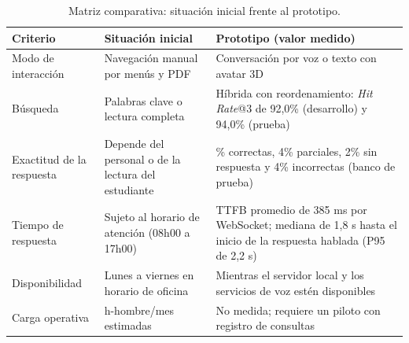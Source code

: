 \begin{table}[H]
  \caption{Matriz comparativa: situación inicial frente al prototipo.}
  \label{tab:matriz_comparativa}
  \centering
  \small
  \renewcommand{\arraystretch}{1.2}
  \begin{tabular}{|>{\raggedright\arraybackslash}p{3.0cm}|>{\raggedright\arraybackslash}p{4.4cm}|>{\raggedright\arraybackslash}p{5.2cm}|}
    \hline
    \rowcolor[HTML]{EFEFEF}
    \textbf{Criterio} & \textbf{Situación inicial} & \textbf{Prototipo (valor medido)} \\ \hline
    Modo de interacción & Navegación manual por menús y PDF & Conversación por voz o texto con avatar 3D \\ \hline
    Búsqueda & Palabras clave o lectura completa & Híbrida con reordenamiento: \textit{Hit Rate}@3 de 92,0\% (desarrollo) y 94,0\% (prueba) \\ \hline
    Exactitud de la respuesta & Depende del personal o de la lectura del estudiante & 90\% correctas, 4\% parciales, 2\% sin respuesta y 4\% incorrectas (banco de prueba) \\ \hline
    Tiempo de respuesta & Sujeto al horario de atención (08h00 a 17h00) & TTFB promedio de 385 ms por WebSocket; mediana de 1,8 s hasta el inicio de la respuesta hablada (P95 de 2,2 s) \\ \hline
    Disponibilidad & Lunes a viernes en horario de oficina & Mientras el servidor local y los servicios de voz estén disponibles \\ \hline
    Carga operativa & 76 h-hombre/mes estimadas & No medida; requiere un piloto con registro de consultas \\ \hline
  \end{tabular}
  \elaboradopor{\autorTFG}
\end{table}

